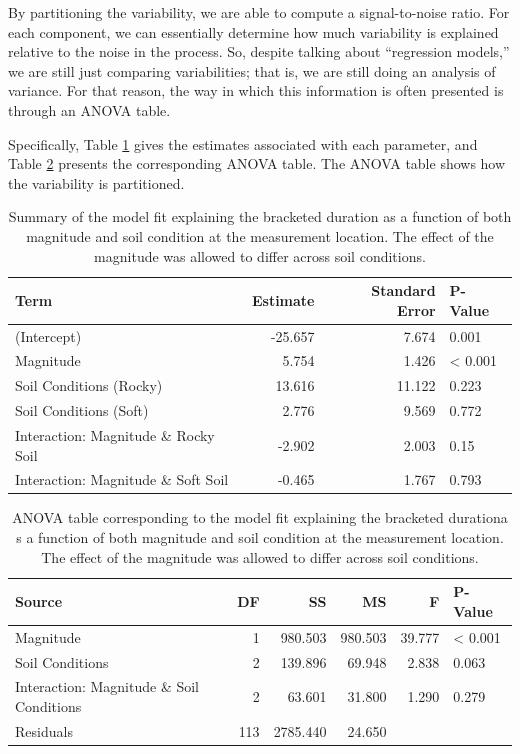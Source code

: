 \documentclass[]{book}
\theoremstyle{definition}
\theoremstyle{definition}
\theoremstyle{definition}
\theoremstyle{remark}
\begin{document}
By partitioning the variability, we are able to compute a
signal-to-noise ratio. For each component, we can essentially determine
how much variability is explained relative to the noise in the process.
So, despite talking about ``regression models,'' we are still just
comparing variabilities; that is, we are still doing an analysis of
variance. For that reason, the way in which this information is often
presented is through an ANOVA table.

Specifically, Table \ref{tab:reginteractions-fit} gives the estimates
associated with each parameter, and Table
\ref{tab:reginteractions-anova} presents the corresponding ANOVA table.
The ANOVA table shows how the variability is partitioned.

\begin{table}

\caption{\label{tab:reginteractions-fit}Summary of the model fit explaining the bracketed duration as a function of both magnitude and soil condition at the measurement location.  The effect of the magnitude was allowed to differ across soil conditions.}
\centering
\begin{tabular}[t]{l|r|r|l}
\hline
Term & Estimate & Standard Error & P-Value\\
\hline
(Intercept) & -25.657 & 7.674 & 0.001\\
\hline
Magnitude & 5.754 & 1.426 & < 0.001\\
\hline
Soil Conditions (Rocky) & 13.616 & 11.122 & 0.223\\
\hline
Soil Conditions (Soft) & 2.776 & 9.569 & 0.772\\
\hline
Interaction: Magnitude \& Rocky Soil & -2.902 & 2.003 & 0.15\\
\hline
Interaction: Magnitude \& Soft Soil & -0.465 & 1.767 & 0.793\\
\hline
\end{tabular}
\end{table}

\begin{table}

\caption{\label{tab:reginteractions-anova}ANOVA table corresponding to the model fit explaining the bracketed durationa s a function of both magnitude and soil condition at the measurement location.  The effect of the magnitude was allowed to differ across soil conditions.}
\centering
\begin{tabular}[t]{l|r|r|r|r|l}
\hline
Source & DF & SS & MS & F & P-Value\\
\hline
Magnitude & 1 & 980.503 & 980.503 & 39.777 & < 0.001\\
\hline
Soil Conditions & 2 & 139.896 & 69.948 & 2.838 & 0.063\\
\hline
Interaction: Magnitude \& Soil Conditions & 2 & 63.601 & 31.800 & 1.290 & 0.279\\
\hline
Residuals & 113 & 2785.440 & 24.650 &  & \\
\hline
\end{tabular}
\end{table}
\end{document}

